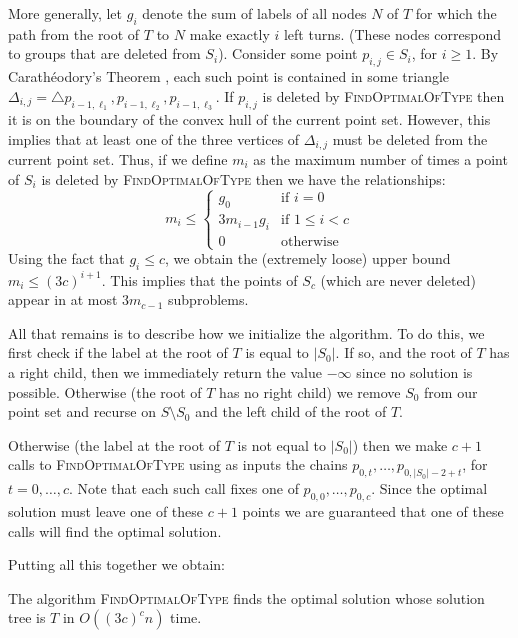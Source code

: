 \documentclass{elsart}
\begin{document}
More generally, let $g_i$ denote the sum of labels of all nodes $N$ of
$T$ for which the path from the root of $T$ to $N$ make exactly $i$
left turns. (These nodes correspond to groups that are deleted from
$S_i$).  Consider some point $p_{i,j}\in S_i$, for $i\ge 1$.  By
Carath\'eodory's Theorem \cite{eckhoff93}, each such point is contained
in some triangle $\Delta_{i,j}=\triangle
p_{i-1,\ell_1},p_{i-1,\ell_2},p_{i-1,\ell_3}$. If $p_{i,j}$ is deleted
by \textsc{FindOptimalOfType} then it is on the boundary of the convex
hull of the current point set.  However, this implies that at least
one of the three vertices of $\Delta_{i,j}$ must be deleted from the
current point set.  Thus, if we define $m_i$ as the maximum number of
times a point of $S_i$ is deleted by \textsc{FindOptimalOfType} then
we have the relationships:
\[ 
    m_i \le \left\{\begin{array}{ll}
            g_0 & \mbox{if $i=0$} \\
            3 m_{i-1} g_i & \mbox{if $1\le i< c$} \\
            0 & \mbox{otherwise}      
        \end{array}\right.
\] 
Using the fact that $g_i \le c$, we obtain the (extremely loose) upper
bound $m_i \le (3c)^{i+1}$.  
This implies that the points of $S_c$
(which are never deleted) appear in at most $3m_{c-1}$ subproblems.

All that remains is to describe how we initialize the algorithm.  To
do this, we first check if the label at the root of $T$ is equal to
$|S_0|$. If so, and the root of $T$ has a right child, then we
immediately return the value $-\infty$ since no solution is possible.
Otherwise (the root of $T$ has no right child) we remove $S_0$ from
our point set and recurse on $S\setminus S_0$ and the left child of
the root of $T$.

Otherwise (the label at the root of $T$ is not equal to $|S_0|$) then
we make $c+1$ calls to \textsc{FindOptimalOfType} using as inputs the
chains $p_{0,t},\ldots,p_{0,|S_0|-2+t}$, for $t=0,\ldots,c$.  Note
that each such call fixes one of $p_{0,0},\ldots,p_{0,c}$.  Since the
optimal solution must leave one of these $c+1$ points we are
guaranteed that one of these calls will find the optimal solution.

Putting all this together we obtain:

\begin{lem}
The algorithm \textsc{FindOptimalOfType} finds the optimal solution
whose solution tree is $T$ in $O((3c)^c n)$ time.
\end{lem}
\end{document}
